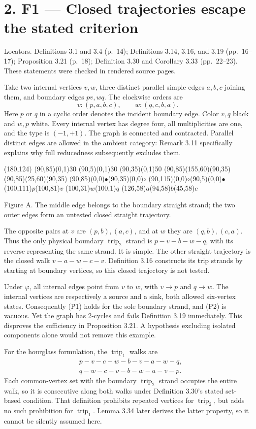\documentclass[10pt]{article}
\begin{document}
\section*{2. F1 — Closed trajectories escape the stated criterion}
Locators. Definitions 3.1 and 3.4 (p. 14); Definitions 3.14, 3.16, and 3.19 (pp. 16–17); Proposition 3.21 (p. 18); Definition 3.30 and Corollary 3.33 (pp. 22–23). These statements were checked in rendered source pages.\par
Take two internal vertices \(v,w\), three distinct parallel simple edges \(a,b,c\) joining them, and boundary edges \(pv,wq\). The clockwise orders are \[v:(p,a,b,c),\qquad w:(q,c,b,a).\] Here \(p\) or \(q\) in a cyclic order denotes the incident boundary edge. Color \(v,q\) black and \(w,p\) white. Every internal vertex has degree four, all multiplicities are one, and the type is \((-1,+1)\). The graph is connected and contracted. Parallel distinct edges are allowed in the ambient category: Remark 3.11 specifically explains why full reducedness subsequently excludes them.\par
(180,124) (90,85)(0,1)30 (90,5)(0,1)30 (90,35)(0,1)50 (90,85)(155,60)(90,35) (90,85)(25,60)(90,35) (90,85)(0,0)\(\bullet\)(90,35)(0,0)\(\circ\) (90,115)(0,0)\(\circ\)(90,5)(0,0)\(\bullet\) (100,111)\(p\)(100,81)\(v\) (100,31)\(w\)(100,1)\(q\) (126,58)\(a\)(94,58)\(b\)(45,58)\(c\)\par
Figure A. The middle edge belongs to the boundary straight strand; the two outer edges form an untested closed straight trajectory.\par
The opposite pairs at \(v\) are \((p,b),(a,c)\), and at \(w\) they are \((q,b),(c,a)\). Thus the only physical boundary \(\operatorname{trip}_2\) strand is \(p-v-b-w-q\), with its reverse representing the same strand. It is simple. The other straight trajectory is the closed walk \(v-a-w-c-v\). Definition 3.16 constructs its trip strands by starting at boundary vertices, so this closed trajectory is not tested.\par
Under \(\varphi\), all internal edges point from \(v\) to \(w\), with \(v\to p\) and \(q\to w\). The internal vertices are respectively a source and a sink, both allowed six-vertex states. Consequently (P1) holds for the sole boundary strand, and (P2) is vacuous. Yet the graph has 2-cycles and fails Definition 3.19 immediately. This disproves the sufficiency in Proposition 3.21. A hypothesis excluding isolated components alone would not remove this example.\par
For the hourglass formulation, the \(\operatorname{trip}_1\) walks are \[\begin{split}
&p-v-c-w-b-v-a-w-q,\\
&q-w-c-v-b-w-a-v-p.
\end{split}\] Each common-vertex set with the boundary \(\operatorname{trip}_2\) strand occupies the entire walk, so it is consecutive along both walks under Definition 3.30’s stated set-based condition. That definition prohibits repeated vertices for \(\operatorname{trip}_2\), but adds no such prohibition for \(\operatorname{trip}_1\). Lemma 3.34 later derives the latter property, so it cannot be silently assumed here.\par
\end{document}
